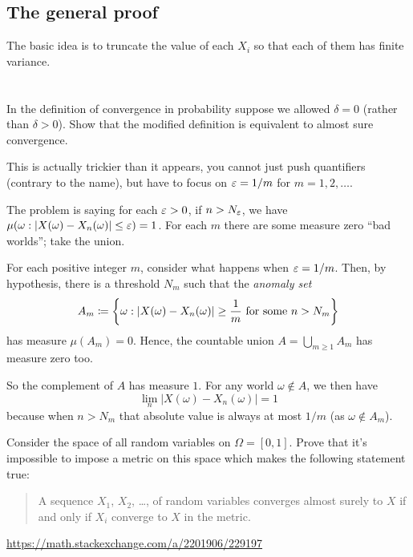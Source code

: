 \subsection{The general proof}

The basic idea is to truncate the value of each $X_i$ so that each of them has finite variance.


\section{\problemhead}
\begin{problem}
	\gim
	In the definition of convergence in probability
	suppose we allowed $\delta = 0$
	(rather than $\delta > 0$).
	Show that the modified definition is
	equivalent to almost sure convergence.
	\begin{hint}
		This is actually trickier than it appears,
		you cannot just push quantifiers (contrary to the name),
		but have to focus on $\varepsilon = 1/m$ for $m = 1, 2, \dots$.

		The problem is saying for each $\varepsilon > 0$,
		if $n > N_\varepsilon$, we have
		$\mu(\omega : |X(\omega)-X_n(\omega)| \le \varepsilon) = 1$.
		For each $m$ there are some measure zero ``bad worlds'';
		take the union.
	\end{hint}
	\begin{sol}
		For each positive integer $m$,
		consider what happens when $\varepsilon = 1/m$.
		Then, by hypothesis, there is a threshold $N_m$
		such that the \emph{anomaly set}
		\[ A_m \coloneqq \left\{ \omega :
			|X(\omega)-X_n(\omega)| \ge \frac 1m
			\text{ for some } n > N_m \right\} \]
		has measure $\mu(A_m) = 0$.
		Hence, the countable union $A = \bigcup_{m \ge 1} A_m$ has measure zero too.

		So the complement of $A$ has measure $1$.
		For any world $\omega \notin A$,
		we then have
		\[ \lim_n \left\lvert X(\omega) - X_n(\omega) \right\rvert = 1 \]
		because when $n > N_m$ that absolute value
		is always at most $1/m$ (as $\omega \notin A_m$).
	\end{sol}
\end{problem}

\begin{problem}
	Consider the space of all random variables on $\Omega = [0,1]$.
	Prove that it's impossible to impose a metric on this space
	which makes the following statement true:
	\begin{quote}
		A sequence $X_1$, $X_2$, \dots, of random variables converges almost surely to $X$
		if and only if $X_i$ converge to $X$ in the metric.
	\end{quote}
	\begin{sol}
		\url{https://math.stackexchange.com/a/2201906/229197}
	\end{sol}
\end{problem}

